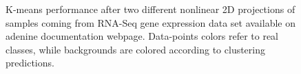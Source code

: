 \documentclass[twoside,11pt]{article}
\makeatletter
\newcommand{\ade}{{\sc adenine}\@\xspace}
\makeatother
\begin{document}
\begin{figure}[]
    \centering
    \hfill%
\caption{\small K-means performance after two different nonlinear 2D projections of samples coming from RNA-Seq gene expression data set available on \ade documentation webpage. Data-points colors refer to real classes, while backgrounds are colored according to clustering predictions.}\label{fig:scatter}
\end{figure}



\newpage

\end{document}
